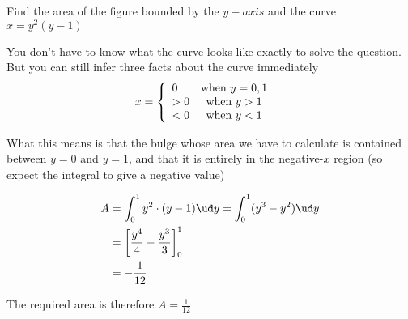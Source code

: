 

\question[3] Find the area of the figure bounded by the $y-axis$ and the curve 
$x=y^2(y-1)$


\ifprintanswers
\fi 

\begin{solution}[\halfpage]
  You don't have to know what the curve looks like exactly to solve the question. 
  But you can still infer three facts about the curve immediately
  \begin{align}
      x &= \left\lbrace
              \begin{array}{l c}
                 0 & \text{when }y=0,1 \\
                 > 0 & \text{when }y > 1 \\
                 < 0 & \text{when }y < 1
              \end{array}\right.
  \end{align}
  
  What this means is that the bulge whose area we have to calculate is 
  contained between $y=0$ and $y=1$, and that it is entirely in the 
  negative-$x$ region (so expect the integral to give a negative value)
  
  \begin{align}
     A &= \int_0^1 y^2\cdot(y-1)\ud y = \int_0^1(y^3-y^2)\ud y \\
       &= \left[ \dfrac{y^4}{4} - \dfrac{y^3}{3}\right]_0^1 \\
       &= -\dfrac{1}{12}
  \end{align}
  
  The required area is therefore $A = \frac{1}{12}$
\end{solution}

